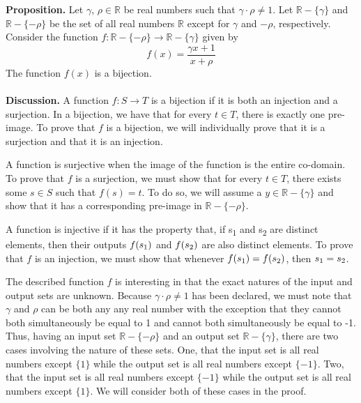 \documentclass[12pt]{exam}
\begin{document}
\begin{questions}
\question
\textbf{Proposition.} Let $\gamma$, $\rho \in \mathbb{R}$ be real numbers such that $\gamma \cdot \rho \neq 1$. Let $\mathbb{R} - \{\gamma\}$ and $\mathbb{R} - \{- \rho\}$ be the set of all real numbers $\mathbb{R}$ except for $\gamma$ and $-\rho$, respectively. Consider the function $f: \mathbb{R} - \{- \rho\} \rightarrow \mathbb{R} - \{\gamma\}$ given by 
\begin{equation*}
f(x) = \frac{\gamma x +1}{x + \rho}
\end{equation*}
The function $f(x)$ is a bijection.
\\
\\\textbf{Discussion.} A function $f: S\rightarrow T$ is a bijection if it is both an injection and a surjection. In a bijection, we have that for every $t \in T$, there is exactly one pre-image. To prove that $f$ is a bijection, we will individually prove that it is a surjection and that it is an injection.
\par
A function is surjective when the image of the function is the entire co-domain. To prove that $f$ is a surjection, we must show that for every $t \in T$, there exists some $s \in S$ such that $f(s) = t$. To do so, we will assume a $y \in \mathbb{R} - \{\gamma\}$ and show that it has a corresponding pre-image in $ \mathbb{R} - \{- \rho\}$.
\par
A function is injective if it has the property that, if s\textsubscript{1} and s\textsubscript{2} are distinct elements, then their outputs  $f(s\textsubscript{1})$ and $f(s\textsubscript{2})$ are also distinct elements. To prove that $f$ is an injection, we must show that whenever $f(s\textsubscript{1}) = f(s\textsubscript{2})$, then $s\textsubscript{1} = s\textsubscript{2}$.
\par 
The described function $f$ is interesting in that the exact natures of the input and output sets are unknown. Because $\gamma \cdot \rho \neq 1$ has been declared, we must note that $\gamma$ and $\rho$ can be both any any real number with the exception that they cannot both simultaneously be equal to 1 and cannot both simultaneously be equal to -1. Thus, having an input set $\mathbb{R} - \{- \rho\}$  and an output set $\mathbb{R} - \{\gamma\}$, there are two cases involving the nature of these sets. One, that the input set is all real numbers except $\{1\}$ while the output set is all real numbers except $\{-1\}$. Two, that the input set is all real numbers except $\{-1\}$ while the output set is all real numbers except $\{1\}$. We will consider both of these cases in the proof.

\end{questions}
\end{document}
